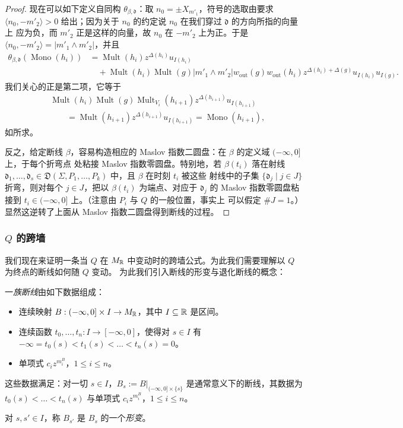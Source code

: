 \begin{proof}
现在可以如下定义自同构 $\theta_{\beta,\mathfrak d}$：取 $n_0 = \pm X_{m'_1}$，符号的选取由要求
$\langle n_0,-m'_2\rangle>0$ 给出；因为关于 $n_0$ 的约定说 $n_0$ 在我们穿过 $\mathfrak d$ 的方向所指的向量上
应为负，而 $m'_2$ 正是这样的向量，故 $n_0$ 在 $-m'_2$ 上为正。于是
$\langle n_0,-m'_2\rangle = |m'_1\wedge m'_2|$，并且
\begin{align*}
\theta_{\beta,\mathfrak d}(\operatorname{Mono}(h_i))
&= \operatorname{Mult}(h_i)z^{\Delta(h_i)}u_{I(h_i)}\\
&\quad + \operatorname{Mult}(h_i)\operatorname{Mult}(g)|m'_1\wedge m'_2|
 w_{\mathrm{out}}(g)w_{\mathrm{out}}(h_i)z^{\Delta(h_i)+\Delta(g)}u_{I(h_i)}u_{I(g)}.
\end{align*}
我们关心的正是第二项，它等于
\begin{align*}
&\operatorname{Mult}(h_i)\operatorname{Mult}(g)\operatorname{Mult}_{V_i}(h_{i+1})
 z^{\Delta(h_{i+1})}u_{I(h_{i+1})}\\
&\qquad= \operatorname{Mult}(h_{i+1})z^{\Delta(h_{i+1})}u_{I(h_{i+1})}
 = \operatorname{Mono}(h_{i+1}),
\end{align*}
如所求。

反之，给定断线 $\beta$，容易构造相应的 Maslov 指数二圆盘：在 $\beta$ 的定义域 $(-\infty,0]$ 上，于每个折弯点
处粘接 Maslov 指数零圆盘。特别地，若 $\beta(t_i)$ 落在射线
$\mathfrak d_1,\dots,\mathfrak d_s\in\mathfrak D(\Sigma,P_1,\dots,P_k)$ 中，且 $\beta$ 在时刻 $t_i$ 被这些
射线中的子集 $\{\mathfrak d_j\mid j\in J\}$ 折弯，则对每个 $j\in J$，把以 $\beta(t_i)$ 为端点、对应于
$\mathfrak d_j$ 的 Maslov 指数零圆盘粘接到 $t_i\in(-\infty,0]$ 上。（注意由 $P_i$ 与 $Q$ 的一般位置，事实上
可以假定 $\#J = 1$。）显然这逆转了上面从 Maslov 指数二圆盘得到断线的过程。
\end{proof}
\subsubsection{$Q$ 的跨墙}
我们现在来证明一条当 $Q$ 在 $M_{\mathbb{R}}$ 中变动时的跨墙公式。为此我们需要理解以 $Q$ 为终点的断线如何随 $Q$ 变动。
为此我们引入断线的形变与退化断线的概念：

\begin{definition}
一\emph{族断线}由如下数据组成：
\begin{itemize}[leftmargin=*]
\item 连续映射 $B : (-\infty,0]\times I \to M_{\mathbb{R}}$，其中 $I\subseteq\mathbb{R}$ 是区间。
\item 连续函数 $t_0,\dots,t_n : I\to[-\infty,0]$，使得对 $s\in I$ 有
$-\infty = t_0(s)<t_1(s)<\dots<t_n(s) = 0$。
\item 单项式 $c_iz^{m^B_i}$，$1\le i\le n$。
\end{itemize}
这些数据满足：对一切 $s\in I$，$B_s := B|_{(-\infty,0]\times\{s\}}$ 是通常意义下的断线，其数据为
$t_0(s)<\dots<t_n(s)$ 与单项式 $c_iz^{m^B_i}$，$1\le i\le n$。

对 $s,s'\in I$，称 $B_{s'}$ 是 $B_s$ 的一个\emph{形变}。
\end{definition}


